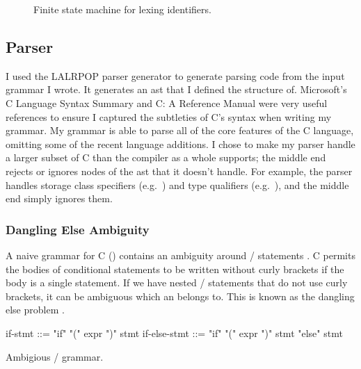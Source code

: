 \documentclass[00-main.tex]{subfiles}
\begin{document}
\begin{figure}[!htb]
  \centering
  \caption{Finite state machine for lexing identifiers.}
  \label{fig:lexing identifiers fsm}
\end{figure}


\subsection{Parser}

I used the LALRPOP parser generator  to generate parsing code from the input grammar I wrote.
It generates an \gls{ast} that I defined the structure of.
Microsoft's C Language Syntax Summary  and C: A Reference Manual  were very useful references to ensure I captured the subtleties of C's syntax when writing my grammar.
My grammar is able to parse all of the core features of the C language, omitting some of the recent language additions. I chose to make my parser handle a larger subset of C than the compiler as a whole supports; the middle end rejects or ignores nodes of the \gls{ast} that it doesn't handle. For example, the parser handles storage class specifiers (e.g.\ ) and type qualifiers (e.g.\ ), and the middle end simply ignores them.

\subsubsection{Dangling Else Ambiguity}

A naive grammar for C () contains an ambiguity around / statements .
C permits the bodies of conditional statements to be written without curly brackets if the body is a single statement.
If we have nested / statements that do not use curly brackets, it can be ambiguous which  an  belongs to. This is known as the dangling else problem .

\begin{listing}[!ht]
  \begin{GrammarListing}
    if-stmt      ::= "if" "(" expr ")" stmt
    if-else-stmt ::= "if" "(" expr ")" stmt "else" stmt
  \end{GrammarListing}
  \caption{Ambigious / grammar.}
  \label{lst:ambiguous if-else grammar}
\end{listing}
\end{document}
